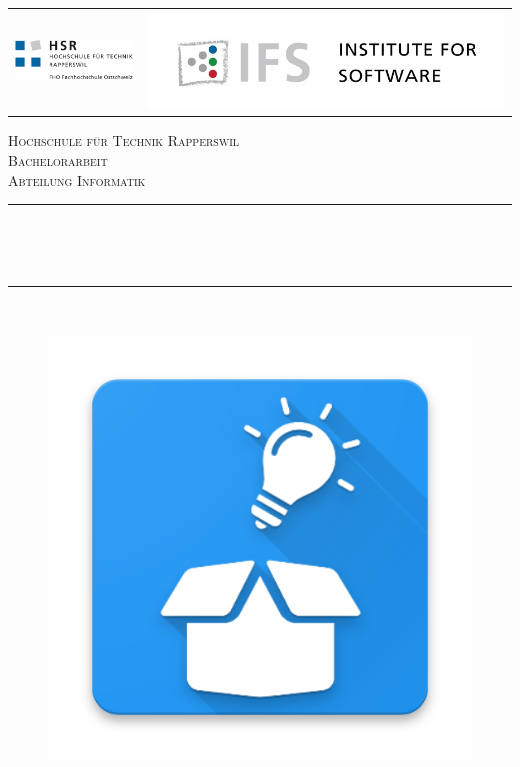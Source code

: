 \begin{titlepage}

\newcommand{\HRule}{\rule{\linewidth}{0.5mm}} %

\center %
\begin{table}[h]
	\begin{tabular}{lr}
		\includegraphics[width=0.3\linewidth]{img/logo/logo-hsr}	\hspace{3cm}
		&
		\includegraphics[width=0.45\linewidth]{img/logo/logo-ifs}
	\end{tabular}
\end{table}
\vspace{0.75cm}
\textsc{\LARGE Hochschule für Technik Rapperswil }\\[1.5cm] %
\textsc{\Large Bachelorarbeit}\\[0.5cm] %
\textsc{\large Abteilung Informatik}\\[0.5cm] %


\makeatletter
\HRule \\[0.4cm]
\begin{doublespacing}
{ \huge \textbf{\@title}}\\[0.2cm] %
\end{doublespacing}
\HRule \\[0.4cm]
 
\begin{figure}[h]
	\centering
	\includegraphics[width=0.5\linewidth]{img/logo/logo-box}
	\label{fig:logo}
\end{figure}



\end{titlepage}
